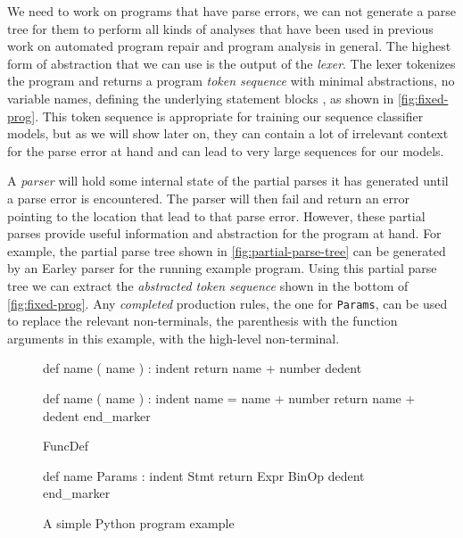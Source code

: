 We need to work on programs that have parse errors, \ie we can not generate a
parse tree for them to perform all kinds of analyses that have been used in
previous work on automated program repair \citep{Sakkas_2020,
Martinez_2013,Gulwani_2018, Wang_2018} and program analysis in general.
%
The highest form of abstraction that we can use is the output of the
\emph{lexer}. The lexer tokenizes the program and returns a program \emph{token
sequence} with minimal abstractions, \eg no variable names, defining the
underlying statement blocks \etc, as shown in \autoref{fig:fixed-prog}. This
token sequence is appropriate for training our sequence classifier models, but
as we will show later on, they can contain a lot of irrelevant context for the
parse error at hand and can lead to very large sequences for our models.

 A \emph{parser} will hold some
internal state of the partial parses it has generated until a parse error is
encountered. The parser will then fail and return an error pointing to the
location that lead to that parse error. However, these partial parses provide
useful information and abstraction for the program at hand. For example, the
partial parse tree shown in \autoref{fig:partial-parse-tree} can be generated by
an Earley parser for the running example program. Using this partial parse tree
we can extract the \emph{abstracted token sequence} shown in the bottom of
\autoref{fig:fixed-prog}. Any \emph{completed} production rules, \eg the
one for \texttt{Params}, can be used to replace the relevant non-terminals,
\eg the parenthesis with the function arguments in this example, with the
high-level non-terminal.

\begin{figure}[t]
\centering
\begin{minipage}[c]{0.54\linewidth}
\begin{ecode}
def name ( name ) : \n
indent return name + number \n
dedent \n

def name ( name ) : \n
indent name = name + number \n
return name + \n
dedent end_marker
\end{ecode}
\label{fig:prog-seq}
\end{minipage}%
\hspace{0.02\linewidth}%
\begin{minipage}[c]{0.44\linewidth}
\begin{ecode}
FuncDef \n

def name Params : \n
indent Stmt \n
return Expr BinOp \n
dedent end_marker
\end{ecode}
\label{fig:abstract-prog-seq}
\end{minipage}
\caption{A simple Python program example}
\end{figure}

